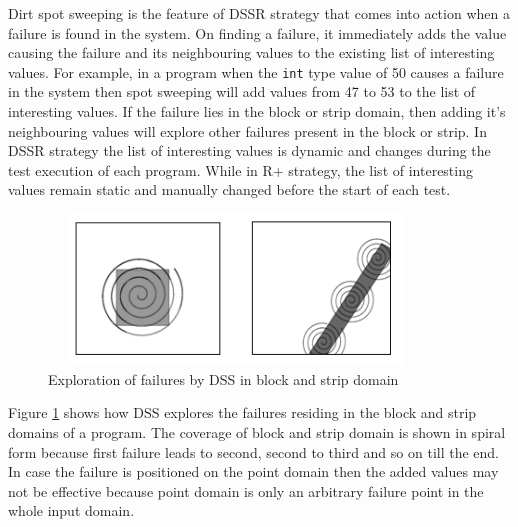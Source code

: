




Dirt spot sweeping is the feature of DSSR strategy that comes into action when a failure is found in the system. On finding a failure, it immediately adds the value causing the failure and its neighbouring values to the existing list of interesting values. For example, in a program when the \verb+int+ type value of 50 causes a failure in the system then spot sweeping will add values from 47 to 53 to the list of interesting values. If the failure lies in the block or strip domain, then adding it's neighbouring values will explore other failures present in the block or strip. In DSSR strategy the list of interesting values is dynamic and changes during the test execution of each program. While in R+ strategy, the list of interesting values remain static and manually changed before the start of each test.

\begin{figure}[ht]
\centering
\includegraphics[width=10cm,height=4cm]{chapter4/block2.png}
\caption{Exploration of failures by DSS in block and strip domain}
\label{fig:block2}
\end{figure}

Figure \ref{fig:block2} shows how DSS explores the failures residing in the block and strip domains of a program. The coverage of block and strip domain is shown in spiral form because first failure leads to second, second to third and so on till the end. In case the failure is positioned on the point domain then the added values may not be effective because point domain is only an arbitrary failure point in the whole input domain.

